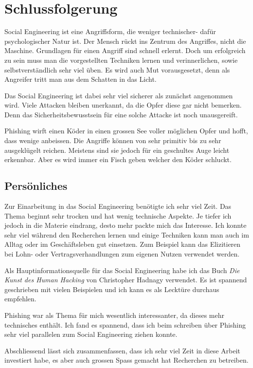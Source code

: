 \chapter{Schlussfolgerung}

Social Engineering ist eine Angriffsform, die weniger technischer- dafür psychologischer Natur ist. Der Mensch rückt ins Zentrum des Angriffes, nicht die Maschine. Grundlagen für einen Angriff sind schnell erlernt. Doch um erfolgreich zu sein muss man die vorgestellten Techniken lernen und verinnerlichen, sowie selbstverständlich sehr viel üben. Es wird auch Mut vorausgesetzt, denn als Angreifer tritt man aus dem Schatten in das Licht. 

Das Social Engineering ist dabei sehr viel sicherer als zunächst angenommen wird. Viele Attacken bleiben unerkannt, da die Opfer diese gar nicht bemerken. Denn das Sicherheitsbewusstsein für eine solche Attacke ist noch unausgereift.

Phishing wirft einen Köder in einen grossen See voller möglichen Opfer und hofft, dass wenige anbeissen. Die Angriffe können von sehr primitiv bis zu sehr ausgeklügelt reichen. Meistens sind sie jedoch für ein geschultes Auge leicht erkennbar. Aber es wird immer ein Fisch geben welcher den Köder schluckt.

\section{Persönliches}
Zur Einarbeitung in das Social Engineering benötigte ich sehr viel Zeit. Das Thema beginnt sehr trocken und hat wenig technische Aspekte. Je tiefer ich jedoch in die Materie eindrang, desto mehr packte mich das Interesse. Ich konnte sehr viel während den Recherchen lernen und einige Techniken kann man auch im Alltag oder im Geschäftsleben gut einsetzen. Zum Beispiel kann das Elizitieren bei Lohn- oder Vertragsverhandlungen zum eigenen Nutzen verwendet werden.

Als Hauptinformationsquelle für das Social Engineering habe ich das Buch \textit{Die Kunst des Human Hacking} von Christopher Hadnagy verwendet. Es ist spannend geschrieben mit vielen Beispielen und ich kann es als Lecktüre durchaus empfehlen.

Phishing war als Thema für mich wesentlich interessanter, da dieses mehr technisches enthält. Ich fand es spannend, dass ich beim schreiben über Phishing sehr viel parallelen zum Social Engineering ziehen konnte.

Abschliessend lässt sich zusammenfassen, dass ich sehr viel Zeit in diese Arbeit investiert habe, es aber auch grossen Spass gemacht hat Recherchen zu betreiben.



\glsaddall
